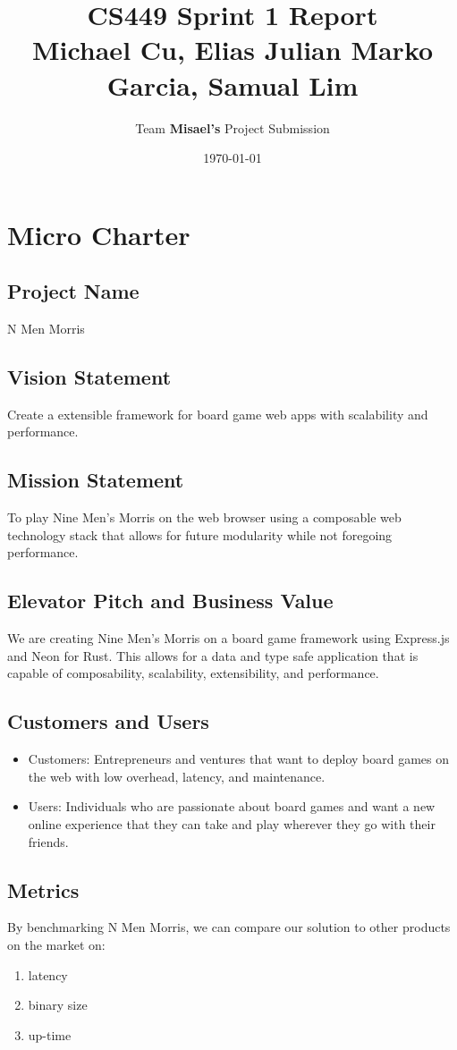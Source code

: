 \documentclass[11pt]{article}
\author{Team \textbf{Misael's} Project Submission}
\date{\today}
\title{CS449 Sprint 1 Report\\\medskip
\large Michael Cu, Elias Julian Marko Garcia, Samual Lim}
\begin{document}
\maketitle
\tableofcontents


\section{Micro Charter}
\label{sec:org03efa7c}
\subsection{Project Name}
\label{sec:org4cbc42f}
N Men Morris
\subsection{Vision Statement}
\label{sec:orgccccd0a}
Create a extensible framework for board game web apps with scalability and performance.
\subsection{Mission Statement}
\label{sec:orgf43ae6a}
To play Nine Men's Morris on the web browser using a composable web technology stack that allows
for future modularity while not foregoing performance.
\subsection{Elevator Pitch and Business Value}
\label{sec:orgf4d267d}
We are creating Nine Men's Morris on a board game framework using Express.js and Neon for
Rust. This allows for a data and type safe application that is capable of composability,
scalability, extensibility, and performance.
\subsection{Customers and Users}
\label{sec:org904de16}
\begin{itemize}
\item Customers: Entrepreneurs and ventures that want to deploy board games on the web with low
overhead, latency, and maintenance.
\item Users: Individuals who are passionate about board games and want a new online experience that
they can take and play wherever they go with their friends.
\end{itemize}
\subsection{Metrics}
\label{sec:org24602e8}
By benchmarking N Men Morris, we can compare our solution to other products on the market on:
\begin{enumerate}
\item latency
\item binary size
\item up-time
\end{enumerate}
\end{document}
